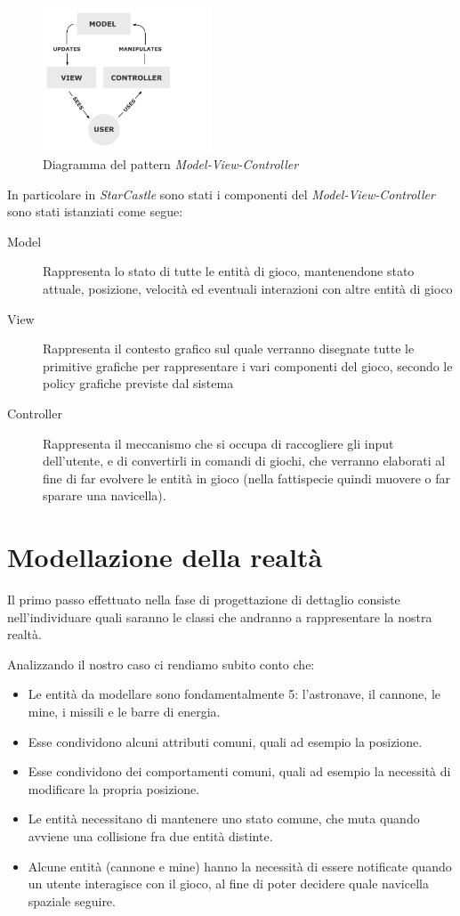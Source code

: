 \documentclass[a4paper,12pt]{article}
\begin{document}
\begin{figure}[h]
\centering
\includegraphics[width=5cm]{mvc.png}
\caption{Diagramma del pattern \emph{Model-View-Controller}}
\label{img:mvc}
\end{figure}

In particolare in \emph{StarCastle} sono stati i componenti del \emph{Model-View-Controller} sono stati istanziati come segue:

\begin{description}
\item[\textsf{Model}] Rappresenta lo stato di tutte le entit\`a di gioco, mantenendone stato attuale, posizione, velocit\`a ed eventuali interazioni con altre entit\`a di gioco
\item[\textsf{View}] Rappresenta il contesto grafico sul quale verranno disegnate tutte le primitive grafiche per rappresentare i vari componenti del gioco, secondo le policy grafiche previste dal sistema
\item[\textsf{Controller}] Rappresenta il meccanismo che si occupa di raccogliere gli input dell'utente, e di convertirli in comandi di giochi, che verranno elaborati al fine di far evolvere le entit\`a in gioco (nella fattispecie quindi muovere o far sparare una navicella).
\end{description}

\section{Modellazione della realt\`a}
\label{sec:stato}

Il primo passo effettuato nella fase di progettazione di dettaglio consiste nell'individuare quali saranno le classi che andranno a rappresentare la nostra realt\`a.

Analizzando il nostro caso ci rendiamo subito conto che:
\begin{itemize}
\item Le entit\`a da modellare sono fondamentalmente 5: l'astronave, il cannone, le mine, i missili e le barre di energia.
\item Esse condividono alcuni attributi comuni, quali ad esempio la posizione.
\item Esse condividono dei comportamenti comuni, quali ad esempio la necessit\`a di modificare la propria posizione.
\item Le entit\`a necessitano di mantenere uno stato comune, che muta quando avviene una collisione fra due entit\`a distinte.
\item Alcune entit\`a (cannone e mine) hanno la necessit\`a di essere notificate quando un utente interagisce con il gioco, al fine di poter decidere quale navicella spaziale seguire.
\end{itemize}
\end{document}
